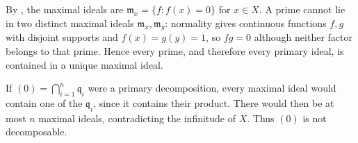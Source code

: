 By , the maximal ideals are $\mathfrak{m}_x=\{f:f(x)=0\}$ for $x\in X$. A prime cannot lie in two distinct maximal ideals $\mathfrak{m}_x,\mathfrak{m}_y$: normality gives continuous functions $f,g$ with disjoint supports and $f(x)=g(y)=1$, so $fg=0$ although neither factor belongs to that prime. Hence every prime, and therefore every primary ideal, is contained in a unique maximal ideal.

If $(0)=\bigcap_{i=1}^n\mathfrak{q}_i$ were a primary decomposition, every maximal ideal would contain one of the $\mathfrak{q}_i$, since it contains their product. There would then be at most $n$ maximal ideals, contradicting the infinitude of $X$. Thus $(0)$ is not decomposable.
